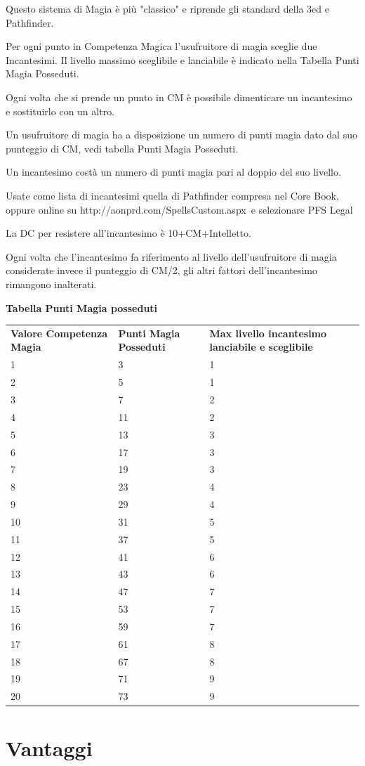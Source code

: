 \documentclass[a4paper,11pt,twoside,openany]{book}
\begin{document}
Questo sistema di Magia è più "classico" e riprende gli standard della 3ed e Pathfinder.

Per ogni punto in Competenza Magica l'usufruitore di magia sceglie due Incantesimi. Il livello massimo sceglibile e lanciabile è indicato nella Tabella Punti Magia Posseduti.

Ogni volta che si prende un punto in CM è possibile dimenticare un incantesimo e sostituirlo con un altro.

Un usufruitore di magia ha a disposizione un numero di punti magia dato dal suo punteggio di CM, vedi tabella Punti Magia Posseduti.

Un incantesimo costà un numero di punti magia pari al doppio del suo livello.

Usate come lista di incantesimi quella di Pathfinder compresa nel Core Book, oppure online su http://aonprd.com/SpellsCustom.aspx\ e selezionare PFS Legal

La DC per resistere all'incantesimo è 10+CM+Intelletto.

Ogni volta che l'incantesimo fa riferimento al livello dell'usufruitore di magia considerate invece il punteggio di CM/2, gli altri fattori dell'incantesimo rimangono inalterati.

\bigskip

\textbf{Tabella Punti Magia posseduti}

\bigskip

\begin{tabularx}{\textwidth}{XXX}
	\toprule
	\textbf{Valore Competenza Magia} & \textbf{Punti Magia Posseduti} & \textbf{Max livello incantesimo lanciabile e sceglibile} \\
	1  & 3& 1\tabularnewline
	2  & 5& 1\tabularnewline
	3  & 7& 2\tabularnewline
	4  & 11    & 2\tabularnewline
	5  & 13    & 3\tabularnewline
	6  & 17    & 3\tabularnewline
	7  & 19    & 3\tabularnewline
	8  & 23    & 4\tabularnewline
	9  & 29    & 4\tabularnewline
	10 & 31    & 5\tabularnewline
	11 & 37    & 5\tabularnewline
	12 & 41    & 6\tabularnewline
	13 & 43    & 6\tabularnewline
	14 & 47    & 7\tabularnewline
	15 & 53    & 7\tabularnewline
	16 & 59    & 7\tabularnewline
	17 & 61    & 8\tabularnewline
	18 & 67    & 8\tabularnewline
	19 & 71    & 9\tabularnewline
	20 & 73    & 9\tabularnewline
\end{tabularx}

\pagebreak

\section{Vantaggi}
\end{document}
